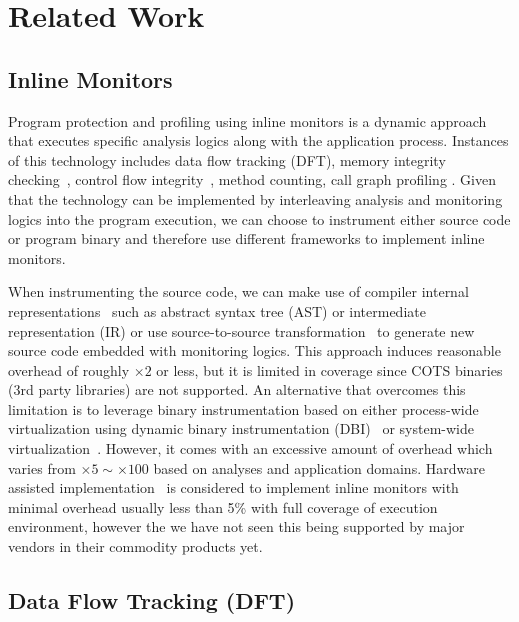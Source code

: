 \section{Related Work}
\label{sec:related}

\subsection{Inline Monitors}
\label{ssec:inline}

Program protection and profiling using inline monitors is a dynamic approach
that executes specific analysis logics along with the application process.
Instances of this technology includes data flow tracking (DFT), memory
integrity checking~\cite{memcheck, drmemory:cgo2011}, control flow
integrity~\cite{cfi}, method counting, call graph profiling \etc. Given that
the technology can be implemented by interleaving analysis and monitoring
logics into the program execution, we can choose to instrument either  source
code or program binary and therefore use different frameworks to implement
inline monitors.

When instrumenting the source code, we can make use of compiler internal
representations~\cite{llvm:cgo04} such as abstract syntax tree (AST) or
intermediate representation (IR) or use source-to-source
transformation~\cite{txl, cil} to generate new source code embedded with
monitoring logics. This approach induces reasonable overhead of roughly
$\times2$ or less, but it is limited in coverage since COTS binaries (\ie 3rd
party libraries) are not supported. An alternative that overcomes this
limitation is to leverage binary instrumentation based on either process-wide
virtualization using dynamic binary instrumentation (DBI)~\cite{pin:pldi2005,
dynamorio, valgrind} or system-wide virtualization~\cite{qemu:usenix05,
xen:sosp2003}. However, it comes with an excessive amount of overhead which
varies from $\times 5 \sim \times 100$ based on analyses and application
domains. Hardware assisted implementation~\cite{raksha:isca2007, lba:isca2008}
is considered to implement inline monitors with minimal overhead usually less
than 5\% with full coverage of execution environment, however the we have not
seen this being supported by major vendors in their commodity products yet.

\subsection{Data Flow Tracking (DFT)}

